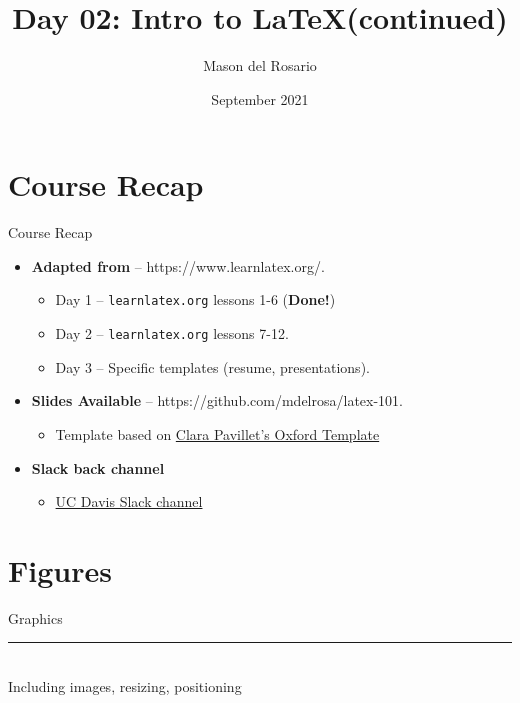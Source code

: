 \documentclass{beamer}
\title{Day 02: Intro to \LaTeX (continued)}
\author{\small{Mason del Rosario}}
\institute{\LaTeX 101}
\date{September 2021} %
\begin{document}
\footnotesize{
% 


{ 
\frame{\titlepage}}

\section{Course Recap}

  \begin{frame}{Course Recap}
    \begin{itemize} 
      \item \textbf{Adapted from} -- https://www.learnlatex.org/. 
        \begin{itemize}
          \item Day 1 -- \texttt{learnlatex.org} lessons 1-6 (\textbf{Done!})
          \item Day 2 -- \texttt{learnlatex.org} lessons 7-12.
          \item Day 3 -- Specific templates (resume, presentations).
        \end{itemize}
      \item \textbf{Slides Available} -- https://github.com/mdelrosa/latex-101.
      \begin{itemize}
        \item Template based on \href{https://www.overleaf.com/latex/templates/oxpav/xnjgrxthvjhg}{Clara Pavillet's Oxford Template}
      \end{itemize}
      \item \textbf{Slack back channel}
      \begin{itemize}
        \item \href{https://join.slack.com/share/zt-ul82okyc-SI2GftuwPx_lFyBXll9rjw}{UC Davis Slack channel}
      \end{itemize}
    \end{itemize}
  \end{frame}

  \section{Figures}

  \begin{frame}[plain]
    \vfill
    \centering
    \begin{beamercolorbox}[sep=8pt,center,shadow=true,rounded=true]{Graphics}
      \insertsectionhead\par%
      \color{davisblue}\noindent\rule{10cm}{1pt} \\
      \footnotesize{Including images, resizing, positioning}
    \end{beamercolorbox}
    \vfill
  \end{frame}

}
\end{document}
